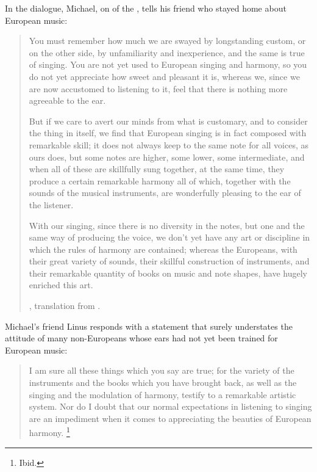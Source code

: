 In the dialogue, Michael, on of the , tells his friend who stayed home about European music:
\begin{quotation}
    You must remember \Dots{} how much we are swayed by longstanding custom, or on the other side, by unfamiliarity and inexperience, and the same is true of singing. 
    You are not yet used to European singing and harmony, so you do not yet appreciate how sweet and pleasant it is, whereas we, since we are now accustomed to listening to it, feel that there is nothing more agreeable to the ear.

    But if we care to avert our minds from what is customary, and to consider the thing in itself, we find that European singing is in fact composed with remarkable skill; it does not always keep to the same note for all voices, as ours does, but some notes are higher, some lower, some intermediate, and when all of these are skillfully sung together, at the same time, they produce a certain remarkable harmony \Dots{} all of which, \Dots{} together with the sounds of the musical instruments, are wonderfully pleasing to the ear of the listener. \Dots{}

    With our singing, since there is no diversity in the notes, but one and the same way of producing the voice, we don't yet have any art or discipline in which the rules of harmony are contained; whereas the Europeans, with their great variety of sounds, their skillful construction of instruments, and their remarkable quantity of books on music and note shapes, have hugely enriched this art.%
    \begin{Footnote}
        \Autocite[109--110]{Sande:DeMissioneLegatorum}, translation from \autocite[155-156]{Massarella:JapaneseTravellers}.
    \end{Footnote}
\end{quotation}
Michael's friend Linus responds with a statement that surely understates the attitude of many non-Europeans whose ears had not yet been trained for European music:
\begin{quote}
    I am sure all these things which you say are true; for the variety of the instruments and the books which you have brought back, as well as the singing and the modulation of harmony, testify to a remarkable artistic system.
    Nor do I doubt that our normal expectations in listening to singing are an impediment when it comes to appreciating the beauties of European harmony.%
    \footnote{Ibid.}
\end{quote}



